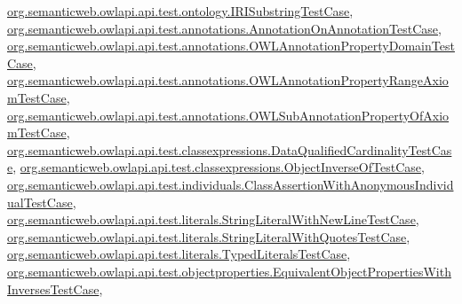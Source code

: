 \hyperlink{classorg_1_1semanticweb_1_1owlapi_1_1api_1_1test_1_1ontology_1_1_i_r_i_substring_test_case_ae27789f1d762890ac4b0d5fb11e45539}{org.\-semanticweb.\-owlapi.\-api.\-test.\-ontology.\-I\-R\-I\-Substring\-Test\-Case}, \hyperlink{classorg_1_1semanticweb_1_1owlapi_1_1api_1_1test_1_1annotations_1_1_annotation_on_annotation_test_case_a016c1f9ae077c8eee14c4b77a2388ced}{org.\-semanticweb.\-owlapi.\-api.\-test.\-annotations.\-Annotation\-On\-Annotation\-Test\-Case}, \hyperlink{classorg_1_1semanticweb_1_1owlapi_1_1api_1_1test_1_1annotations_1_1_o_w_l_annotation_property_domain_test_case_abcafbd0f508ab8c144e0f4ab48f6ce95}{org.\-semanticweb.\-owlapi.\-api.\-test.\-annotations.\-O\-W\-L\-Annotation\-Property\-Domain\-Test\-Case}, \hyperlink{classorg_1_1semanticweb_1_1owlapi_1_1api_1_1test_1_1annotations_1_1_o_w_l_annotation_property_range_axiom_test_case_aac5800dfc2fd98015d5cc73020ce4ba2}{org.\-semanticweb.\-owlapi.\-api.\-test.\-annotations.\-O\-W\-L\-Annotation\-Property\-Range\-Axiom\-Test\-Case}, \hyperlink{classorg_1_1semanticweb_1_1owlapi_1_1api_1_1test_1_1annotations_1_1_o_w_l_sub_annotation_property_of_axiom_test_case_a162148e8f615a6ad0b9f3b35cd45c1a5}{org.\-semanticweb.\-owlapi.\-api.\-test.\-annotations.\-O\-W\-L\-Sub\-Annotation\-Property\-Of\-Axiom\-Test\-Case}, \hyperlink{classorg_1_1semanticweb_1_1owlapi_1_1api_1_1test_1_1classexpressions_1_1_data_qualified_cardinality_test_case_a81e2a63fa5ff7acf2666addb9de4108d}{org.\-semanticweb.\-owlapi.\-api.\-test.\-classexpressions.\-Data\-Qualified\-Cardinality\-Test\-Case}, \hyperlink{classorg_1_1semanticweb_1_1owlapi_1_1api_1_1test_1_1classexpressions_1_1_object_inverse_of_test_case_a219194fa90888e58c17a75a64d2e4c7f}{org.\-semanticweb.\-owlapi.\-api.\-test.\-classexpressions.\-Object\-Inverse\-Of\-Test\-Case}, \hyperlink{classorg_1_1semanticweb_1_1owlapi_1_1api_1_1test_1_1individuals_1_1_class_assertion_with_anonymous_individual_test_case_ae55582e130dea46eec23bb6c2b4f64bf}{org.\-semanticweb.\-owlapi.\-api.\-test.\-individuals.\-Class\-Assertion\-With\-Anonymous\-Individual\-Test\-Case}, \hyperlink{classorg_1_1semanticweb_1_1owlapi_1_1api_1_1test_1_1literals_1_1_string_literal_with_new_line_test_case_a0dd31a0035397965544df48313a887af}{org.\-semanticweb.\-owlapi.\-api.\-test.\-literals.\-String\-Literal\-With\-New\-Line\-Test\-Case}, \hyperlink{classorg_1_1semanticweb_1_1owlapi_1_1api_1_1test_1_1literals_1_1_string_literal_with_quotes_test_case_a311637a329a90a40319497de83d59cc4}{org.\-semanticweb.\-owlapi.\-api.\-test.\-literals.\-String\-Literal\-With\-Quotes\-Test\-Case}, \hyperlink{classorg_1_1semanticweb_1_1owlapi_1_1api_1_1test_1_1literals_1_1_typed_literals_test_case_a90c51d75274cdc11dd807d01c0971284}{org.\-semanticweb.\-owlapi.\-api.\-test.\-literals.\-Typed\-Literals\-Test\-Case}, \hyperlink{classorg_1_1semanticweb_1_1owlapi_1_1api_1_1test_1_1objectproperties_1_1_equivalent_object_properties_with_inverses_test_case_abaaeb9ab8c28a19876b4e686edc3251a}{org.\-semanticweb.\-owlapi.\-api.\-test.\-objectproperties.\-Equivalent\-Object\-Properties\-With\-Inverses\-Test\-Case}, 